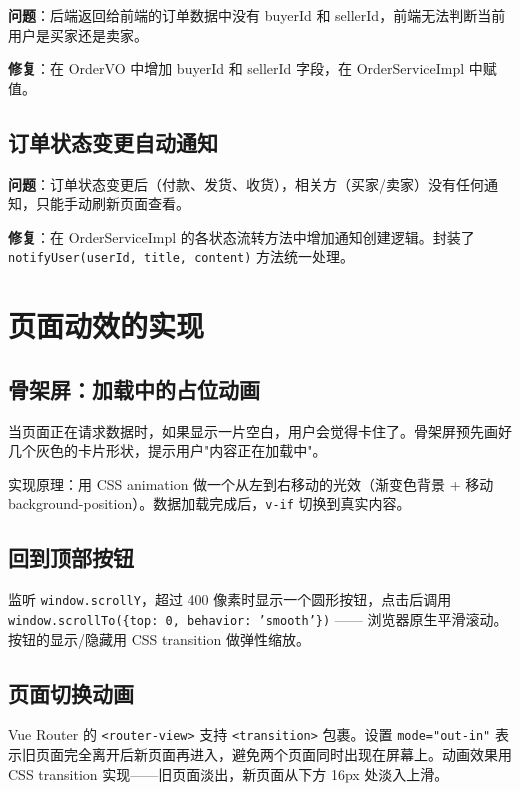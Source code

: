 \documentclass[12pt,a4paper]{ctexart}
\begin{document}
\textbf{问题}：后端返回给前端的订单数据中没有 buyerId 和 sellerId，前端无法判断当前用户是买家还是卖家。

\textbf{修复}：在 OrderVO 中增加 buyerId 和 sellerId 字段，在 OrderServiceImpl 中赋值。

\subsection{订单状态变更自动通知}

\textbf{问题}：订单状态变更后（付款、发货、收货），相关方（买家/卖家）没有任何通知，只能手动刷新页面查看。

\textbf{修复}：在 OrderServiceImpl 的各状态流转方法中增加通知创建逻辑。封装了 \texttt{notifyUser(userId, title, content)} 方法统一处理。

\section{页面动效的实现}

\subsection{骨架屏：加载中的占位动画}

当页面正在请求数据时，如果显示一片空白，用户会觉得卡住了。骨架屏预先画好几个灰色的卡片形状，提示用户"内容正在加载中"。

实现原理：用 CSS animation 做一个从左到右移动的光效（渐变色背景 + 移动 background-position）。数据加载完成后，\texttt{v-if} 切换到真实内容。

\subsection{回到顶部按钮}

监听 \texttt{window.scrollY}，超过 400 像素时显示一个圆形按钮，点击后调用 \texttt{window.scrollTo(\{top: 0, behavior: 'smooth'\})} —— 浏览器原生平滑滚动。按钮的显示/隐藏用 CSS transition 做弹性缩放。

\subsection{页面切换动画}

Vue Router 的 \texttt{<router-view>} 支持 \texttt{<transition>} 包裹。设置 \texttt{mode="out-in"} 表示旧页面完全离开后新页面再进入，避免两个页面同时出现在屏幕上。动画效果用 CSS transition 实现——旧页面淡出，新页面从下方 16px 处淡入上滑。
\end{document}
